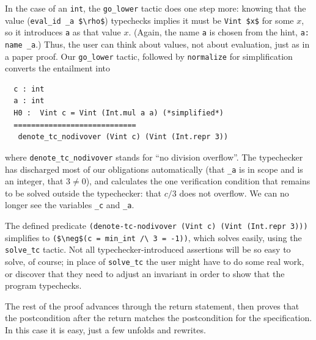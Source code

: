 \documentclass{puthesis}
\begin{document}
In the case of an \lstinline{int}, the \lstinline|go_lower| tactic does one step more:
knowing that the value (\lstinline|eval_id _a $\rho$|) typechecks
implies it must be \lstinline|Vint $x$| for some $x$, so it introduces
\lstinline|a| as that value $x$.  (Again, the name \lstinline|a| is
chosen from the hint, \lstinline|a: name _a|.)  Thus, the user can
think about values, not about evaluation, just as in a paper proof.
Our \lstinline|go_lower| tactic, followed by \lstinline|normalize| for
simplification converts the entailment into

\begin{lstlisting}
  c : int
  a : int
  H0 :  Vint c = Vint (Int.mul a a) (*simplified*)
  ============================
   denote_tc_nodivover (Vint c) (Vint (Int.repr 3))
\end{lstlisting}
where \lstinline|denote_tc_nodivover| stands for ``no division
overflow''. The typechecker has discharged most of our obligations
automatically (that \lstinline|_a| is in scope and is an integer, that
$3 \neq 0$),
and calculates the one verification condition that remains to be
solved outside the typechecker: that $c/3$ does not overflow.  We can no longer see the
variables \lstinline|_c| and \lstinline|_a|.

The defined predicate \lstinline|(denote-tc-nodivover (Vint c) (Vint (Int.repr 3)))|
simplifies to \lstinline|($\neg$(c = min_int /\ 3 = -1))|,
which solves easily, using the \lstinline|solve_tc| tactic.
Not all typechecker-introduced assertions will be so easy
to solve, of course; in place of \lstinline|solve_tc|
the user might have to do some real work, or discover that they need
to adjust an invariant in order to show that the program typechecks.

The rest of the proof advances through the return statement, then proves that
the postcondition after the return matches the postcondition for the 
specification. In this case it is easy, just a few unfolds and rewrites.
\end{document}
